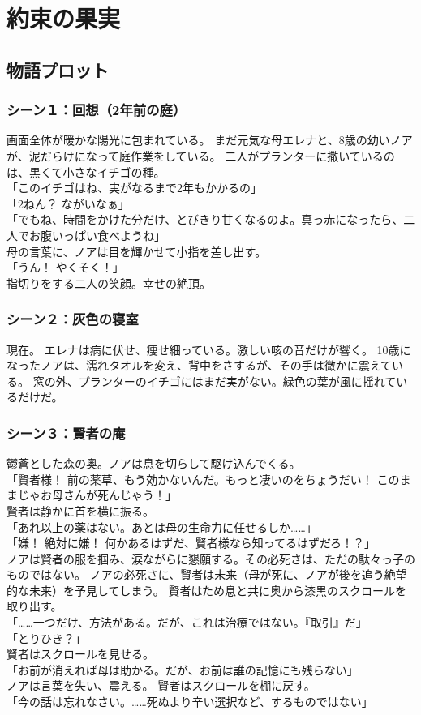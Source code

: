 \chapter{約束の果実}

\section{物語プロット}
\subsection{シーン１：回想（2年前の庭）}
画面全体が暖かな陽光に包まれている。
まだ元気な母エレナと、8歳の幼いノアが、泥だらけになって庭作業をしている。
二人がプランターに撒いているのは、黒くて小さなイチゴの種。
\\「このイチゴはね、実がなるまで2年もかかるの」
\\「2ねん？ ながいなぁ」
\\「でもね、時間をかけた分だけ、とびきり甘くなるのよ。真っ赤になったら、二人でお腹いっぱい食べようね」\\
母の言葉に、ノアは目を輝かせて小指を差し出す。
\\「うん！ やくそく！」\\
指切りをする二人の笑顔。幸せの絶頂。

\subsection{シーン２：灰色の寝室}
現在。%
エレナは病に伏せ、痩せ細っている。激しい咳の音だけが響く。
10歳になったノアは、濡れタオルを変え、背中をさするが、その手は微かに震えている。
窓の外、プランターのイチゴにはまだ実がない。緑色の葉が風に揺れているだけだ。

\subsection{シーン３：賢者の庵}
鬱蒼とした森の奥。ノアは息を切らして駆け込んでくる。
\\「賢者様！ 前の薬草、もう効かないんだ。もっと凄いのをちょうだい！ このままじゃお母さんが死んじゃう！」\\
賢者は静かに首を横に振る。
\\「あれ以上の薬はない。あとは母の生命力に任せるしか……」
\\「嫌！ 絶対に嫌！ 何かあるはずだ、賢者様なら知ってるはずだろ！？」\\
ノアは賢者の服を掴み、涙ながらに懇願する。その必死さは、ただの駄々っ子のものではない。
ノアの必死さに、賢者は未来（母が死に、ノアが後を追う絶望的な未来）を予見してしまう。
賢者はため息と共に奥から漆黒のスクロールを取り出す。
\\「……一つだけ、方法がある。だが、これは治療ではない。『取引』だ」
\\「とりひき？」\\
賢者はスクロールを見せる。%
\\「お前が消えれば母は助かる。だが、お前は誰の記憶にも残らない」\\
ノアは言葉を失い、震える。
賢者はスクロールを棚に戻す。
\\「今の話は忘れなさい。……死ぬより辛い選択など、するものではない」

